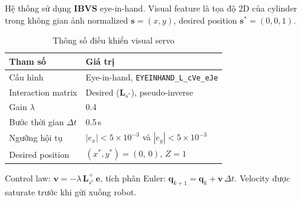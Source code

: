 Hệ thống sử dụng \textbf{IBVS} eye-in-hand. Visual feature là
tọa độ 2D của cylinder trong không gian ảnh normalized
$\mathbf{s}=(x,y)$, desired position $\mathbf{s}^*=(0,0,1)$.

\begin{table}[htbp]
  \centering
  \caption{Thông số điều khiển visual servo}
  \label{tab:ai3-servo}
  \small
  \begin{tabular}{ll}
    \toprule
    \textbf{Tham số}            & \textbf{Giá trị} \\
    \midrule
    Cấu hình                    & Eye-in-hand, \texttt{EYEINHAND\_L\_cVe\_eJe} \\
    Interaction matrix          & Desired ($\mathbf{L}_{s^*}$), pseudo-inverse \\
    Gain $\lambda$              & 0.4 \\
    Bước thời gian $\Delta t$   & 0.5\,s \\
    Ngưỡng hội tụ               & $|e_x| < 5{\times}10^{-3}$ và $|e_y| < 5{\times}10^{-3}$ \\
    Desired position            & $(x^*, y^*) = (0,\,0)$, $Z = 1$ \\
    \bottomrule
  \end{tabular}
\end{table}

Control law:
$\mathbf{v} = -\lambda\,\mathbf{L}_{s^*}^{+}\,\mathbf{e}$,
tích phân Euler:
$\mathbf{q}_{k+1} = \mathbf{q}_k + \mathbf{v}\,\Delta t$.
Velocity được saturate trước khi gửi xuống robot.
